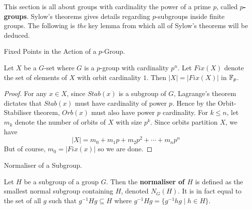 \documentclass[../../book.tex]{subfiles}
\begin{document}
This section is all about 
groups with cardinality the power of a prime $p$, called \textbf{$p$-groups}. 
Sylow's theorems gives details regarding $p$-subgroups inside finite groups.
The following is \emph{the} key lemma
from which all of Sylow's theorems will be deduced. 

\begin{dfn} Fixed Points in the Action of a $p$-Group. 
    
    Let $X$ be a $G$-set where $G$ is a $p$-group with cardinality $p^n$.
    Let $Fix(X)$ denote the set of elements of $X$ with orbit cardinality $1$. 
    Then $|X| = |Fix(X)|$ in $\mathbb{F}_p$. 
    
\end{dfn}
\begin{proof}
    
    For any $x \in X$, since $Stab(x)$ is a subgroup of $G$, 
    Lagrange's theorem dictates that $Stab(x)$ must have cardinality of power $p$.
    Hence by the Orbit-Stabiliser theorem, 
    $Orb(x)$ must also have power $p$ cardinality. 
    For $k \leq n$, let $m_k$ denote the number of orbits of $X$ with size $p^k$. 
    Since orbits partition $X$, we have \[
        |X| = m_0 + m_1 p + m_2 p^2 + \cdots + m_n p^n
    \]
    But of course, $m_0 = |Fix(x)|$ so we are done. 
\end{proof}

\begin{dfn} Normaliser of a Subgroup. 
    
    Let $H$ be a subgroup of a group $G$. 
    Then the \textbf{normaliser of $H$} is defined as the smallest normal subgroup
    containing $H$, denoted $N_G(H)$. 
    It is in fact equal to the set of all $g$ such that $g^{-1}Hg \subseteq H$
    where $g^{-1} H g = \{ g^{-1}hg \mid h \in H \}$. 
    
\end{dfn}
\end{document}
